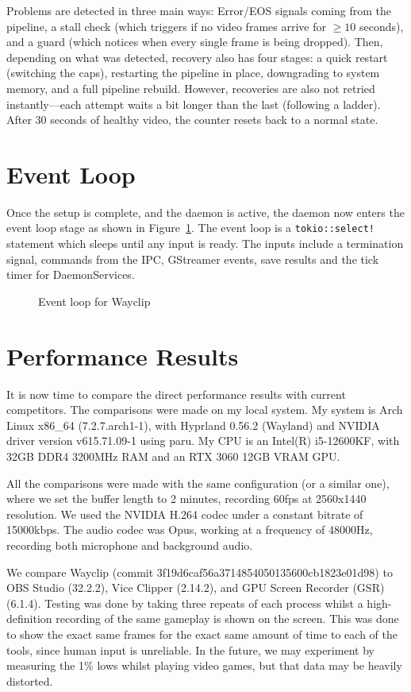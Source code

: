 Problems are detected in three main ways: Error/EOS signals coming from the pipeline, a stall check (which triggers if no video frames arrive for $\ge 10$ seconds), and a guard (which notices when every single frame is being dropped).
Then, depending on what was detected, recovery also has four stages: a quick restart (switching the caps), restarting the pipeline in place, downgrading to system memory, and a full pipeline rebuild.
However, recoveries are also not retried instantly---each attempt waits a bit longer than the last (following a ladder). After 30 seconds of healthy video, the counter resets back to a normal state.


\section{Event Loop}

Once the setup is complete, and the daemon is active, the daemon now enters the event loop stage as shown in Figure~\ref{fig:event_loop}.
The event loop is a \lstinline|tokio::select!| statement which sleeps until any input is ready. The inputs include a termination signal, commands from the IPC, GStreamer events, save results and the tick timer for DaemonServices.

\begin{figure}[htbp]
	\centering
	
	\caption{Event loop for Wayclip}
	\label{fig:event_loop}
\end{figure}

\section{Performance Results} \label{sec:results}

It is now time to compare the direct performance results with current competitors. The comparisons were made on my local system.
My system is Arch Linux x86\_64 (7.2.7.arch1-1), with Hyprland 0.56.2 (Wayland) and NVIDIA driver version v615.71.09-1 using paru.
My CPU is an Intel(R) i5-12600KF, with 32GB DDR4 3200MHz RAM and an RTX 3060 12GB VRAM GPU.

All the comparisons were made with the same configuration (or a similar one), where we set the buffer length to 2 minutes, recording 60fps at 2560x1440 resolution.
We used the NVIDIA H.264 codec under a constant bitrate of 15000kbps. The audio codec was Opus, working at a frequency of 48000Hz, recording both microphone and background audio.

We compare Wayclip (commit 3f19d6caf56a3714854050135600cb1823e01d98) to OBS Studio (32.2.2), Vice Clipper (2.14.2), and GPU Screen Recorder (GSR) (6.1.4).
Testing was done by taking three repeats of each process whilst a high-definition recording of the same gameplay is shown on the screen. This was done to show the exact same frames for the exact same amount of time to each of the tools, since human input is unreliable.
In the future, we may experiment by measuring the 1\% lows whilst playing video games, but that data may be heavily distorted.

